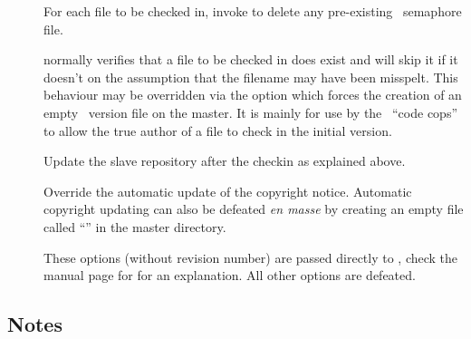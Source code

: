 \begin{description}
\item[]
   For each file to be checked in, invoke  to delete any
   pre-existing \rcs\ semaphore file.

\item[]
    normally verifies that a file to be checked in does exist and will
   skip it if it doesn't on the assumption that the filename may have been
   misspelt.  This behaviour may be overridden via the  option which
   forces the creation of an empty \rcs\ version file on the master.  It is
   mainly for use by the \aipspp\ ``code cops'' to allow the true author of a
   file to check in the initial version.

\item[]
   Update the slave repository after the checkin as explained above.

\item[]
   Override the automatic update of the copyright notice.  Automatic copyright
   updating can also be defeated \emph{en masse} by creating an empty file
   called ``'' in the master directory.

\item[]
   These options (without revision number) are passed directly to
   , check the manual page for  for an explanation.
   All other  options are defeated.
\end{description}

\subsection*{Notes}

